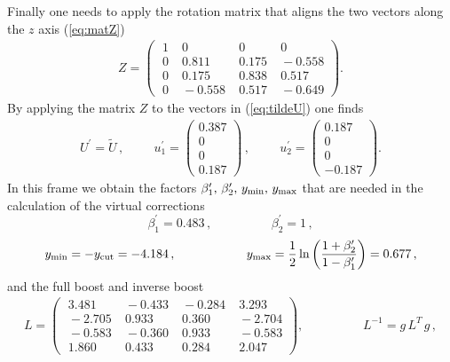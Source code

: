 \documentclass[11pt,a4paper]{article}
\begin{document}
Finally one needs to apply the rotation matrix that aligns the two vectors along the $z$ axis (\ref{eq:matZ})
\begin{align}
Z =  \left(
\begin{array}{cccc}
\; 1&\; 0 &\;0 &\; 0\\
\; 0 &\; 0.811 &\; 0.175  &\; -0.558  \\
\; 0 &\; 0.175  &\; 0.838 &\; 0.517 \\
\; 0&\; -0.558&\; 0.517 &\; -0.649
\end{array}
\right)  .
\end{align}
By applying the matrix $Z$ to the vectors in (\ref{eq:tildeU}) one finds
\begin{align}
U^\prime=\tilde{ U }\,,\hspace{1cm}u^\prime_1=\left(\begin{matrix} 0.387\\0\\ 0\\0.187\end{matrix}\right)\,,\hspace{1cm}u^\prime_2=\left(\begin{matrix} 0.187\\0\\ 0\\-0.187\end{matrix}\right).
\end{align}
In this frame we obtain the factors $\beta'_1,\, \beta'_2,\, y_{{\rm min}},\, y_{{\rm max}} $ that are needed in the calculation of the virtual corrections
\begin{equation}
\beta^\prime_1=0.483 \, , \hspace{2cm}\beta^\prime_2=1\,, \nonumber
\end{equation}
\begin{equation} 
y_{{\rm min}}=-y_{{\rm cut}}=-4.184 \, ,\hspace{2cm}y_{{\rm max}}= \frac{1}{2}\ln \left(\frac{1+\beta^\prime_2}{1-\beta^\prime_1}\right)=0.677\, ,\label{eq:app_yminymax}
\end{equation}
and the full boost and inverse boost 
\begin{align}
L = \left(
\begin{array}{cccc}
\; 3.481&\; -0.433 &\; -0.284 &\; 3.293\\
\; -2.705 &\; 0.933 &\; 0.360  &\; -2.704  \\
\; -0.583 &\; -0.360  &\; 0.933 &\; -0.583 \\
\; 1.860&\;  0.433 &\; 0.284 &\; 2.047
\end{array}
\right),\hspace{2cm}
L^{-1} = g \, L^T \, g\,, \label{eq:app_boosts}
\end{align}
\end{document}
